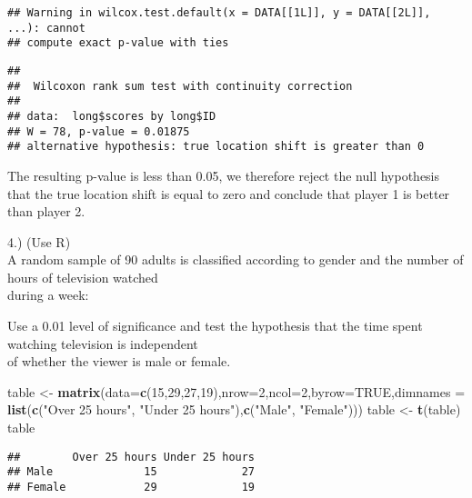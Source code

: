 \documentclass[
]{article}
\newenvironment{Shaded}{\begin{snugshade}}{\end{snugshade}}
\newcommand{\AttributeTok}[1]{\textcolor[rgb]{0.13,0.29,0.53}{#1}}
\newcommand{\ConstantTok}[1]{\textcolor[rgb]{0.56,0.35,0.01}{#1}}
\newcommand{\DecValTok}[1]{\textcolor[rgb]{0.00,0.00,0.81}{#1}}
\newcommand{\FunctionTok}[1]{\textcolor[rgb]{0.13,0.29,0.53}{\textbf{#1}}}
\newcommand{\NormalTok}[1]{#1}
\newcommand{\OtherTok}[1]{\textcolor[rgb]{0.56,0.35,0.01}{#1}}
\newcommand{\StringTok}[1]{\textcolor[rgb]{0.31,0.60,0.02}{#1}}
\begin{document}
\begin{verbatim}
## Warning in wilcox.test.default(x = DATA[[1L]], y = DATA[[2L]], ...): cannot
## compute exact p-value with ties
\end{verbatim}

\begin{verbatim}
## 
##  Wilcoxon rank sum test with continuity correction
## 
## data:  long$scores by long$ID
## W = 78, p-value = 0.01875
## alternative hypothesis: true location shift is greater than 0
\end{verbatim}

The resulting p-value is less than 0.05, we therefore reject the null
hypothesis that the true location shift is equal to zero and conclude
that player 1 is better than player 2.

4.) (Use R)\\
A random sample of 90 adults is classified according to gender and the
number of hours of television watched\\
during a week:

\hfill\break
Use a 0.01 level of significance and test the hypothesis that the time
spent watching television is independent\\
of whether the viewer is male or female.

\begin{Shaded}
\begin{Highlighting}[]
\NormalTok{table }\OtherTok{\textless{}{-}} \FunctionTok{matrix}\NormalTok{(}\AttributeTok{data=}\FunctionTok{c}\NormalTok{(}\DecValTok{15}\NormalTok{,}\DecValTok{29}\NormalTok{,}\DecValTok{27}\NormalTok{,}\DecValTok{19}\NormalTok{),}\AttributeTok{nrow=}\DecValTok{2}\NormalTok{,}\AttributeTok{ncol=}\DecValTok{2}\NormalTok{,}\AttributeTok{byrow=}\ConstantTok{TRUE}\NormalTok{,}\AttributeTok{dimnames =} \FunctionTok{list}\NormalTok{(}\FunctionTok{c}\NormalTok{(}\StringTok{"Over 25 hours"}\NormalTok{, }\StringTok{"Under 25 hours"}\NormalTok{),}\FunctionTok{c}\NormalTok{(}\StringTok{"Male"}\NormalTok{, }\StringTok{"Female"}\NormalTok{)))}
\NormalTok{table }\OtherTok{\textless{}{-}} \FunctionTok{t}\NormalTok{(table)}
\NormalTok{table}
\end{Highlighting}
\end{Shaded}

\begin{verbatim}
##        Over 25 hours Under 25 hours
## Male              15             27
## Female            29             19
\end{verbatim}
\end{document}
